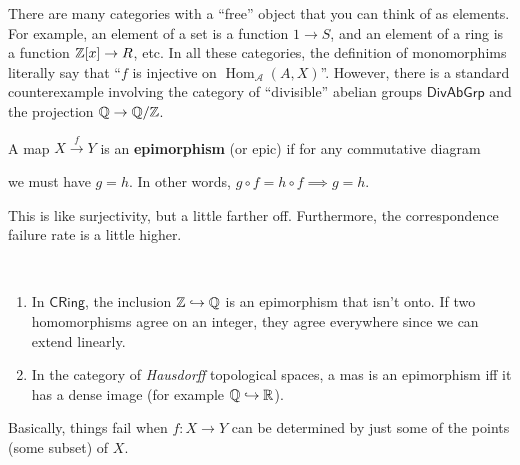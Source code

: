 There are many categories with a ``free'' object that you can think of as elements. For example, an element of a set is a function $1 \to S$, and an element of a ring is a function $\mathbb{Z}[x]\to R$, etc. In all these categories, the definition of monomorphims literally say that ``$f$ is injective on $\operatorname{Hom}_{\mathcal{A} }(A,X)$''. However, there is a standard counterexample involving the category of ``divisible'' abelian groups $\mathsf{DivAbGrp} $ and the projection $\mathbb{Q}\to \mathbb{Q} /\mathbb{Z}$.
\begin{definition}[Epimorphisms]
    A map $X \overset{f}{\to } Y$ is an \textbf{epimorphism} (or epic) if for any commutative diagram 
    \begin{figure}[H]
    \centering
    \end{figure}
    we must have $g=h$. In other words, $g\circ f=h\circ f\implies g=h$. \end{definition}
This is like surjectivity, but a little farther off. Furthermore, the correspondence failure rate is a little higher.
\begin{example}
    \,
    \begin{enumerate}[label=(\alph*)]
        \item In $\mathsf{CRing} $, the inclusion $\mathbb{Z}\hookrightarrow \mathbb{Q}$ is an epimorphism that isn't onto. If two homomorphisms agree on an integer, they agree everywhere since we can extend linearly.
        \item In the category of \emph{Hausdorff} topological spaces, a mas is an epimorphism iff it has a dense image (for example $\mathbb{Q}\hookrightarrow \mathbb{R}$). 
    \end{enumerate}
    Basically, things fail when $f \colon X \to Y$ can be determined by just some of the points (some subset) of $X$.
\end{example}


